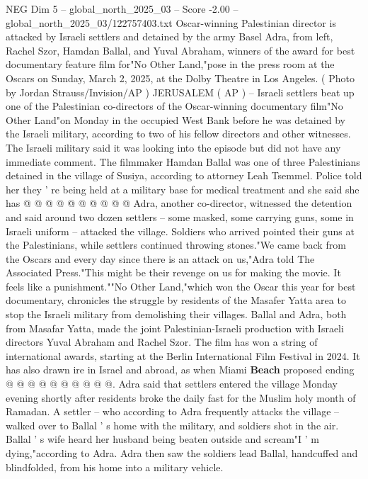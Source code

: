 \begin{textsample}{NEG Dim 5 – global\_north\_2025\_03 – Score -2.00 – global\_north\_2025\_03/122757403.txt}  \label{ex:f5_neg_250}
Oscar-winning Palestinian director is attacked by Israeli settlers and detained by the army Basel Adra, from left, Rachel Szor, Hamdan Ballal, and Yuval Abraham, winners of the award for best documentary feature film for"No Other Land,"pose in the press room at the Oscars on Sunday, March 2, 2025, at the Dolby Theatre in Los Angeles. ( Photo by Jordan Strauss/Invision/AP ) JERUSALEM ( AP ) -- Israeli settlers beat up one of the Palestinian co-directors of the Oscar-winning documentary film"No Other Land"on Monday in the occupied West Bank before he was detained by the Israeli military, according to two of his fellow directors and other witnesses.
The Israeli military said it was looking into the episode but did not have any immediate comment.
The filmmaker Hamdan Ballal was one of three Palestinians detained in the village of Susiya, according to attorney Leah Tsemmel.
Police told her they ' re being held at a military base for medical treatment and she said she has @ @ @ @ @ @ @ @ @ @ Adra, another co-director, witnessed the detention and said around two dozen settlers -- some masked, some carrying guns, some in Israeli uniform -- attacked the village.
Soldiers who arrived pointed their guns at the Palestinians, while settlers continued throwing stones."We came back from the Oscars and every day since there is an attack on us,"Adra told The Associated Press."This might be their revenge on us for making the movie.
It feels like a punishment.""No Other Land,"which won the Oscar this year for best documentary, chronicles the struggle by residents of the Masafer Yatta area to stop the Israeli military from demolishing their villages.
Ballal and Adra, both from Masafar Yatta, made the joint Palestinian-Israeli production with Israeli directors Yuval Abraham and Rachel Szor.
The film has won a string of international awards, starting at the Berlin International Film Festival in 2024.
It has also drawn ire in Israel and abroad, as when Miami \textbf{Beach} proposed ending @ @ @ @ @ @ @ @ @ @.
Adra said that settlers entered the village Monday evening shortly after residents broke the daily fast for the Muslim holy month of Ramadan.
A settler -- who according to Adra frequently attacks the village -- walked over to Ballal ' s home with the military, and soldiers shot in the air.
Ballal ' s wife heard her husband being beaten outside and scream"I ' m dying,"according to Adra.
Adra then saw the soldiers lead Ballal, handcuffed and blindfolded, from his home into a military vehicle.

\end{textsample}
